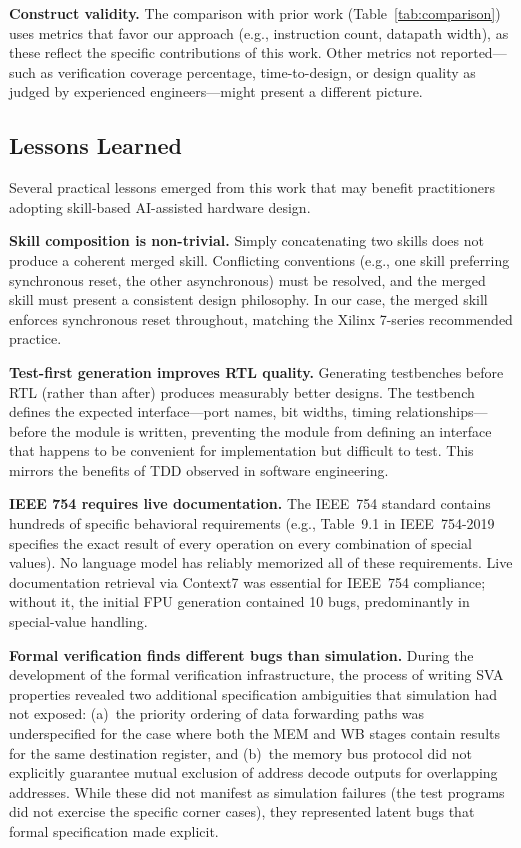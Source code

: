 \documentclass[journal]{IEEEtran}
\begin{document}
\textbf{Construct validity.}  The comparison with prior work
(Table~\ref{tab:comparison}) uses metrics that favor our approach (e.g.,
instruction count, datapath width), as these reflect the specific
contributions of this work.  Other metrics not reported---such as
verification coverage percentage, time-to-design, or design quality as
judged by experienced engineers---might present a different picture.

\subsection{Lessons Learned}

Several practical lessons emerged from this work that may benefit
practitioners adopting skill-based AI-assisted hardware design.

\textbf{Skill composition is non-trivial.}  Simply concatenating two
skills does not produce a coherent merged skill.  Conflicting
conventions (e.g., one skill preferring synchronous reset, the other
asynchronous) must be resolved, and the merged skill must present a
consistent design philosophy.  In our case, the merged skill enforces
synchronous reset throughout, matching the Xilinx 7-series recommended
practice.

\textbf{Test-first generation improves RTL quality.}  Generating
testbenches before RTL (rather than after) produces measurably better
designs.  The testbench defines the expected interface---port names, bit
widths, timing relationships---before the module is written, preventing
the module from defining an interface that happens to be convenient for
implementation but difficult to test.  This mirrors the benefits of TDD
observed in software engineering.

\textbf{IEEE 754 requires live documentation.}  The IEEE~754 standard
contains hundreds of specific behavioral requirements (e.g., Table~9.1
in IEEE~754-2019 specifies the exact result of every operation on every
combination of special values).  No language model has reliably
memorized all of these requirements.  Live documentation retrieval via
Context7 was essential for IEEE~754 compliance; without it, the initial
FPU generation contained 10 bugs, predominantly in special-value
handling.

\textbf{Formal verification finds different bugs than simulation.}
During the development of the formal verification infrastructure, the
process of writing SVA properties revealed two additional specification
ambiguities that simulation had not exposed: (a)~the priority ordering of
data forwarding paths was underspecified for the case where both the MEM
and WB stages contain results for the same destination register, and
(b)~the memory bus protocol did not explicitly guarantee mutual exclusion
of address decode outputs for overlapping addresses.  While these did not
manifest as simulation failures (the test programs did not exercise the
specific corner cases), they represented latent bugs that formal
specification made explicit.
\end{document}
